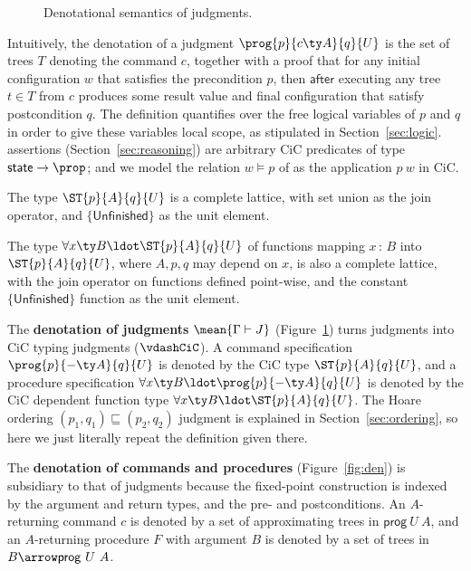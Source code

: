 \begin{figure}[t]
\figsize
\figDenJdg
\caption{Denotational semantics of \SCST judgments.}
\label{fig:denj}
\end{figure}


Intuitively, the denotation of a \SCST judgment $\prog{p}{c \ty A}{q}{U}$
is the set of trees $T$ denoting the command $c$, together with a
proof that for any initial configuration $w$ that satisfies the
precondition $p$, then $\mathsf{after}$ executing any tree $t \in T$
from $c$ produces some result value and final configuration that
satisfy postcondition $q$. The definition quantifies over the free
logical variables of $p$ and $q$ in order to give these variables
local scope, as stipulated in Section~\ref{sec:logic}.
%
\SCST assertions (Section~\ref{sec:reasoning}) are arbitrary CiC
predicates of type $\mathsf{state} \to \prop$; and we model the
relation $w \models p$ of \SCST as the application $p\ w$ in CiC.

\begin{lemma}
  The type $\ST{p}{A}{q}{U}$ is a complete lattice, with set
  union as the join operator, and $\{\mathsf{Unfinished}\}$ as the unit
  element.

  The type $\forall{x \ty B}\ldot \ST{p}{A}{q}{U}$ of functions
  mapping $x\,{:}\,B$ into $\ST{p}{A}{q}{U}$, where $A, p, q$
  may depend on $x$, is also a complete lattice, with the join
  operator on functions defined point-wise, and the constant
  $\{\mathsf{Unfinished}\}$ function as the unit element.
\end{lemma}

The \textbf{denotation of judgments} $\mean{\Gamma \vdash J}$
(Figure~\ref{fig:denj}) turns \SCST judgments into CiC typing
judgments ($\vdashCiC$). 
% 
A command specification $\prog{p}{- \ty A}{q}{U}$ is denoted by the CiC
type $\ST{p}{A}{q}{U}$, and a procedure specification $\forall x \ty
B\ldot \prog{p}{- \ty A}{q}{U}$ is denoted by the CiC dependent function
type $\forall{x \ty B}\ldot \ST{p}{A}{q}{U}$. %
%
The Hoare ordering $(p_1, q_1) \sqsubseteq (p_2, q_2)$ judgment is
explained in Section~\ref{sec:ordering}, so here we just literally
repeat the definition given there.

The \textbf{denotation of commands and procedures}
(Figure~\ref{fig:den}) is subsidiary to that of judgments because the
fixed-point construction is indexed by the argument and return types,
and the pre- and postconditions. %
An $A$-returning command $c$ is denoted by a set of approximating
trees in $\mathsf{prog}~U~A$, and an $A$-returning procedure $F$ with
argument $B$ is denoted by a set of trees in $B \arrow
\mathsf{prog}~U~A$. 

